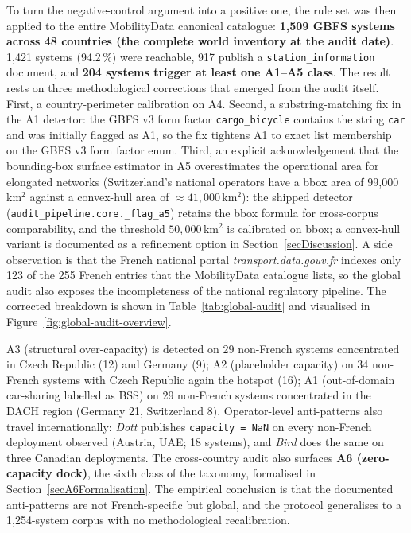\documentclass[11pt,a4paper]{article}
\begin{document}
\label{secGlobalAudit}%
To turn the negative-control argument into a positive one, the rule
set was then applied to the entire MobilityData canonical catalogue:
\textbf{1{,}509 GBFS systems across 48 countries (the complete world
inventory at the audit date)}. 1{,}421 systems (94.2\,\%) were
reachable, 917 publish a \texttt{station\_information} document, and
\textbf{204 systems trigger at least one A1--A5 class}. The result
rests on three methodological corrections that emerged from the audit
itself. First, a country-perimeter calibration on A4. Second, a
substring-matching fix in the A1 detector: the GBFS v3 form factor
\texttt{cargo\_bicycle} contains the string \texttt{car} and was
initially flagged as A1, so the fix tightens A1 to exact list
membership on the GBFS v3 form factor enum. Third, an explicit
acknowledgement that the bounding-box surface estimator in A5
overestimates the operational area for elongated networks
(Switzerland's national operators have a bbox area of
99{,}000\,km$^2$ against a convex-hull area of
$\approx 41{,}000$\,km$^2$): the shipped detector
(\texttt{audit\_pipeline.core.\_flag\_a5}) retains the bbox formula
for cross-corpus comparability, and the threshold
$50{,}000$\,km$^2$ is calibrated on bbox; a convex-hull
variant is documented as a refinement option in
Section~\ref{secDiscussion}. A side observation is that the French
national portal \emph{transport.data.gouv.fr} indexes only 123 of
the 255 French entries that the MobilityData catalogue lists, so
the global audit also exposes the incompleteness of the national
regulatory pipeline. The corrected breakdown is shown in
Table~\ref{tab:global-audit} and visualised in
Figure~\ref{fig:global-audit-overview}.

A3 (structural over-capacity) is detected on 29 non-French systems
concentrated in Czech Republic (12) and Germany (9); A2 (placeholder
capacity) on 34 non-French systems with Czech Republic again the
hotspot (16); A1 (out-of-domain car-sharing labelled as BSS) on 29
non-French systems concentrated in the DACH region (Germany 21,
Switzerland 8). Operator-level anti-patterns also travel
internationally: \emph{Dott} publishes \texttt{capacity = NaN} on
every non-French deployment observed (Austria, UAE; 18 systems),
and \emph{Bird} does the same on three Canadian deployments. The
cross-country audit also surfaces \textbf{A6 (zero-capacity dock)},
the sixth class of the taxonomy, formalised in
Section~\ref{secA6Formalisation}. The empirical conclusion is that
the documented anti-patterns are not French-specific but global,
and the protocol generalises to a 1{,}254-system corpus with no
methodological recalibration.
\end{document}
